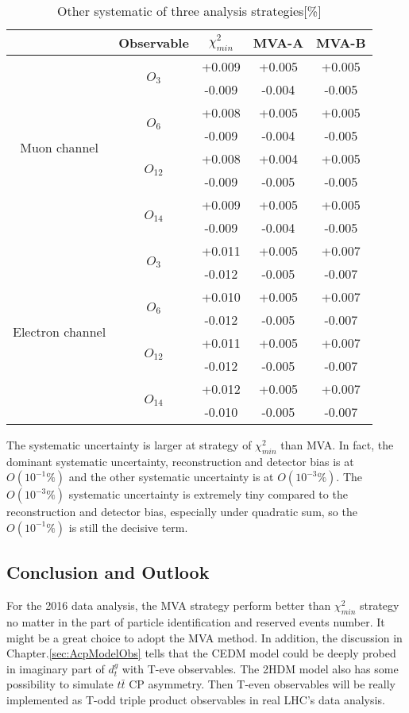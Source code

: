 		\begin{center}
		\setlength{\tabcolsep}{12pt}
		\begin{longtable}{ | c | c | c c c | }
		\caption{Other systematic of three analysis strategies[\%]} \\
		\hline
		 & Observable & $\chi^2_{min}$ & MVA-A & MVA-B \\ 
		\hline
		\multirow{8}{5em}{Muon channel} & \multirow{2}{2em}{$O_{3}$} & +0.009 & +0.005 & +0.005 \\
		 &  & -0.009 & -0.004 & -0.005 \\ 
		 & \multirow{2}{2em}{$O_{6}$} & +0.008 & +0.005 & +0.005 \\
		 &  & -0.009 & -0.004 & -0.005 \\ 
		 & \multirow{2}{2em}{$O_{12}$} & +0.008 & +0.004 & +0.005 \\
		 &  & -0.009 & -0.005 & -0.005 \\ 
		 & \multirow{2}{2em}{$O_{14}$} & +0.009 & +0.005 & +0.005 \\
		 &  & -0.009 & -0.004 & -0.005 \\ 
		 \hline
		\multirow{8}{5em}{Electron channel} & \multirow{2}{2em}{$O_{3}$} & +0.011 & +0.005 & +0.007 \\
		 &  & -0.012 & -0.005 & -0.007 \\ 
		 & \multirow{2}{2em}{$O_{6}$} & +0.010 & +0.005 & +0.007 \\
		 &  & -0.012 & -0.005 & -0.007 \\ 
		 & \multirow{2}{2em}{$O_{12}$} & +0.011 & +0.005 & +0.007 \\
		 &  & -0.012 & -0.005 & -0.007 \\ 
		 & \multirow{2}{2em}{$O_{14}$} & +0.012 & +0.005 & +0.007 \\
		 &  & -0.010 & -0.005 & -0.007 \\ 
		\hline
		\end{longtable}
		\end{center}
		\FloatBarrier

		The systematic uncertainty is larger at strategy of $\chi^2_{min}$ than MVA. In fact, the dominant systematic uncertainty, reconstruction and detector bias is at $O(10^{-1}\%)$ and the other systematic uncertainty is at $O(10^{-3}\%)$. The $O(10^{-3}\%)$ systematic uncertainty is extremely tiny compared to the reconstruction and detector bias, especially under quadratic sum, so the $O(10^{-1}\%)$ is still the decisive term. 

	\subsection{Conclusion and Outlook}
	\label{ssec:Result_Conclusion}
		For the 2016 data analysis, the MVA strategy perform better than $\chi_{min}^2$ strategy no matter in the part of particle identification and reserved events number. It might be a great choice to adopt the MVA method. In addition, the discussion in Chapter.\ref{sec:AcpModelObs} tells that the CEDM model could be deeply probed in imaginary part of $d_t^g$ with T-eve observables. The 2HDM model also has some possibility to simulate $t\bar{t}$ CP asymmetry. Then T-even observables will be really implemented as T-odd triple product observables in real LHC's data analysis. 

